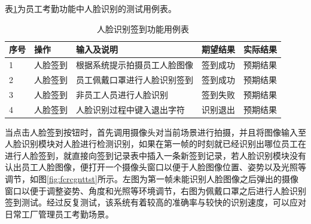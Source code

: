表\ref{tab:fcrcgnts}为员工考勤功能中人脸识别的测试用例表。

\begin{table}[H]
    \centering
    \caption{人脸识别签到功能用例表}
    \label{tab:fcrcgnts}
    \begin{tabularx}{.95\textwidth}{p{2em}<{\centering}X<{\centering}p{16em}<{\centering}X<{\centering}X<{\centering}}
        \toprule
        序号 & 操作 & 输入及说明 & 期望结果 & 实际结果 \\
        \midrule
        1 & 人脸签到 & 根据系统提示拍摄员工人脸图像 & 签到成功 & 预期结果 \\
        2 & 人脸签到 & 员工佩戴口罩进行人脸识别签到 & 签到成功 & 预期结果 \\
        3 & 人脸签到 & 非员工人员进行人脸识别 & 签到失败 & 预期结果 \\
        4 & 人脸签到 & 人脸识别过程中键入退出字符 & 识别退出 & 预期结果 \\
        \bottomrule
    \end{tabularx}
\end{table}

当点击人脸签到按钮时，首先调用摄像头对当前场景进行拍摄，并且将图像输入至人脸识别模块对人脸进行检测识别，如果在第一帧的时刻就已经识别出哪位员工在进行人脸签到，就直接向签到记录表中插入一条新签到记录，若人脸识别模块没有认出员工人脸图像，便打开一个摄像头窗口以便于人脸图像位置、姿势以及光照等调节，如图\ref{fig:fcrcgnttst}所示。左图为第一帧未能识别人脸图像之后弹出的摄像窗口以便于调整姿势、角度和光照等环境调节，右图为佩戴口罩之后进行人脸识别签到测试。经过反复测试，该系统有着较高的准确率与较快的识别速度，可以应对日常工厂管理员工考勤场景。

